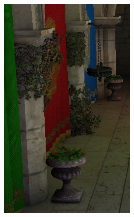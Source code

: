 \begin{figure}[htb]
\begin{subfigure}[b]{0.32\textwidth}
        \includegraphics[width=.95\textwidth]{screenshots/interleaved_without_textured}
        \caption{}
        \label{fig:results:interleaved_without_textured}
    \end{subfigure}
    \begin{subfigure}[b]{0.32\textwidth}
        \centering

\end{subfigure}
\end{figure}
